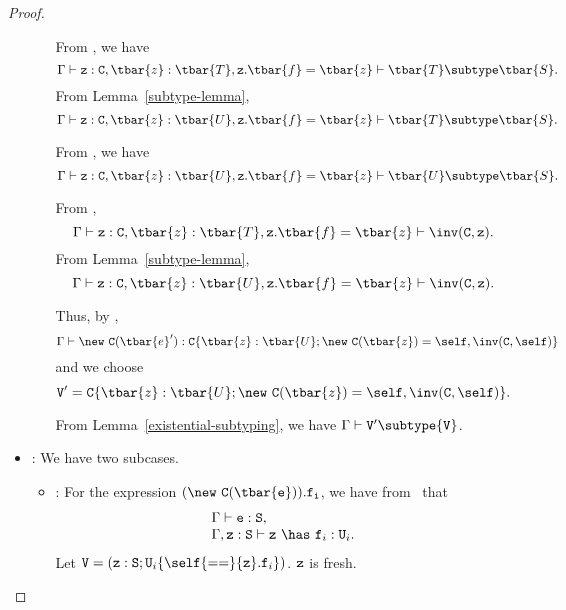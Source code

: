 \begin{proof}
\begin{itemize}
\begin{itemize}


            From \TNew,
            we have
            $$\Gamma \vdash {\tt z}: {\tt C}, \tbar{z}: \tbar{T}, {\tt z}.\tbar{f} = \tbar{z} \vdash \tbar{T} \subtype \tbar{S}.$$
            From Lemma~\ref{subtype-lemma},
            $$\Gamma \vdash {\tt z}: {\tt C}, \tbar{z}: \tbar{U}, {\tt z}.\tbar{f} = \tbar{z} \vdash \tbar{T} \subtype \tbar{S}.$$

            From ,
            we have
            $$\Gamma \vdash {\tt z}: {\tt C}, \tbar{z}: \tbar{U}, {\tt z}.\tbar{f} = \tbar{z} \vdash \tbar{U} \subtype \tbar{S}.$$

            From \TNew,
            $$\Gamma \vdash {\tt z}: {\tt C}, \tbar{z}: \tbar{T}, {\tt z}.\tbar{f} = \tbar{z} \vdash \inv({\tt C}, {\tt z}).$$
            From Lemma~\ref{subtype-lemma},
            $$\Gamma \vdash {\tt z}: {\tt C}, \tbar{z}: \tbar{U}, {\tt z}.\tbar{f} = \tbar{z} \vdash \inv({\tt C}, {\tt z}).$$

            Thus, by \TNew,
            $$\Gamma \vdash {\new\ {\tt C}(\tbar{e}')} : {\tt C}\{ \tbar{z}: \tbar{U}; \new\ {\tt C}(\tbar{z}) = \self, \inv({\tt C}, \self)\}$$
            and we choose
            $${\tt V}' = {\tt C}\{ \tbar{z}: \tbar{U}; \new\ {\tt C}(\tbar{z}) = \self, \inv({\tt C}, \self)\}.$$

            From Lemma~\ref{existential-subtyping}, we have
            $\Gamma \vdash {\tt V}' \subtype {\tt V}$.
   \end{itemize}
\item
\TField: We have two subcases.
   \begin{itemize}
   \item
   \RField:  For the expression ${\tt (\new\ C(\tbar{e})).f_i}$, 
             we have from \TField\ that
             $$
             \begin{array}{l}
             \Gamma \vdash {\tt e}: {\tt S}, \\
             \Gamma, {\tt z}: {\tt S} \vdash {\tt z}\ \has\ {\tt f}_i: {\tt U}_i. \\
             \end{array}$$
             Let ${\tt V} = ({\tt z}: {\tt S}; {\tt U}_i\{\self{\tt ==}{\tt z}.{\tt f}_i\})$.
             ${\tt z}$ is fresh.


\end{itemize}
\end{itemize}
\end{proof}
